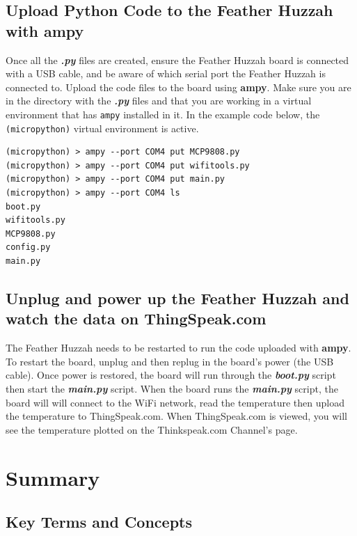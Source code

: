 \documentclass{book}
\begin{document}
    \subsection{\texorpdfstring{Upload Python Code to the Feather Huzzah
with
\textbf{ampy}}{Upload Python Code to the Feather Huzzah with ampy}}\label{upload-python-code-to-the-feather-huzzah-with-ampy}

    Once all the \textbf{\emph{.py}} files are created, ensure the Feather
Huzzah board is connected with a USB cable, and be aware of which serial
port the Feather Huzzah is connected to. Upload the code files to the
board using \textbf{ampy}. Make sure you are in the directory with the
\textbf{\emph{.py}} files and that you are working in a virtual
environment that has \lstinline!ampy! installed in it. In the example
code below, the \lstinline!(micropython)! virtual environment is active.

\begin{lstlisting}
(micropython) > ampy --port COM4 put MCP9808.py
(micropython) > ampy --port COM4 put wifitools.py
(micropython) > ampy --port COM4 put main.py
(micropython) > ampy --port COM4 ls
boot.py
wifitools.py
MCP9808.py
config.py
main.py
\end{lstlisting}

    \subsection{Unplug and power up the Feather Huzzah and watch the data on
ThingSpeak.com}\label{unplug-and-power-up-the-feather-huzzah-and-watch-the-data-on-thingspeak.com}

    The Feather Huzzah needs to be restarted to run the code uploaded with
\textbf{ampy}. To restart the board, unplug and then replug in the
board's power (the USB cable). Once power is restored, the board will
run through the \textbf{\emph{boot.py}} script then start the
\textbf{\emph{main.py}} script. When the board runs the
\textbf{\emph{main.py}} script, the board will will connect to the WiFi
network, read the temperature then upload the temperature to
ThingSpeak.com. When ThingSpeak.com is viewed, you will see the
temperature plotted on the Thinkspeak.com Channel's page.

    \section{Summary}\label{summary}

    \subsection{Key Terms and Concepts}\label{key-terms-and-concepts}
\end{document}
